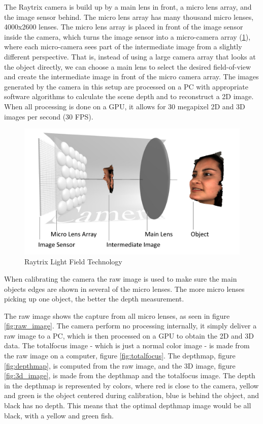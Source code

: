 The Raytrix camera is build up by a main lens in front, a micro lens array, and the image sensor behind. The micro lens array has many thousand micro lenses, 4000x2600 lenses. The micro lens array is placed in front of the image sensor inside the camera, which turns the image sensor into a micro-camera array (\ref{fig:light_field}), where each micro-camera sees part of the intermediate image from a slightly different perspective. That is, instead of using a large camera array that looks at the object directly, we can choose a main lens to select the desired field-of-view and create the intermediate image in front of the micro camera array. The images generated by the camera in this setup are processed on a PC with appropriate software algorithms to calculate the scene depth and to reconstruct a 2D image. When all processing is done on a GPU, it allows for 30 megapixel 2D and 3D images per second (30 FPS). \cite{website:raytrix_technology}

\begin{figure}[h]
    \centering
    \includegraphics[width=.9\linewidth]{Images/Light-Field-Camera-Schematic}
    \caption{Raytrix Light Field Technology}
    \label{fig:light_field}
\end{figure}

When calibrating the camera the raw image is used to make sure the main objects edges are shown in several of the micro lenses. The more micro lenses picking up one object, the better the depth measurement. 

The raw image shows the capture from all micro lenses, as seen in figure \ref{fig:raw_image}. The camera perform no processing internally, it simply deliver a raw image to a PC, which is then processed on a GPU to obtain the 2D and 3D data. 
The totalfocus image - which is just a normal color image - is made from the raw image on a computer, figure \ref{fig:totalfocus}. 
The depthmap, figure \ref{fig:depthmap}, is computed from the raw image, and the 3D image, figure \ref{fig:3d_image}, is made from the depthmap and the totalfocus image. 
The depth in the depthmap is represented by colors, where red is close to the camera, yellow and green is the object centered during calibration, blue is behind the object, and black has no depth. This means that the optimal depthmap image would be all black, with a yellow and green fish.

